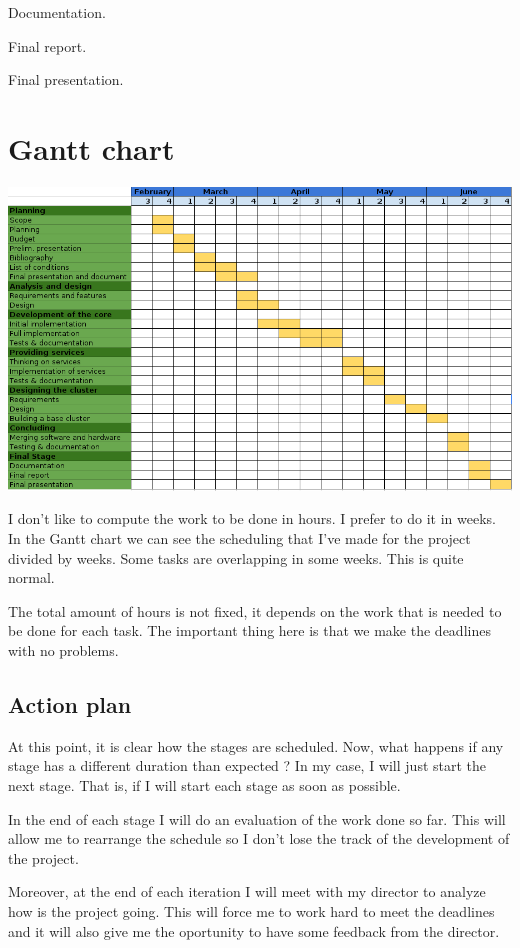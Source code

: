 \mylist
  \item Documentation.
  \item Final report.
  \item Final presentation.
\mylistend

\section*{Gantt chart}

\begin{center}
  \hspace*{-2cm}
  \includegraphics[scale=0.75]{images/gantt.png}
\end{center}

I don't like to compute the work to be done in hours. I prefer to do it in
weeks. In the Gantt chart we can see the scheduling that I've made for the
project divided by weeks. Some tasks are overlapping in some weeks. This is
quite normal.

The total amount of hours is not fixed, it depends on the work that is needed
to be done for each task. The important thing here is that we make the
deadlines with no problems.

\subsection{Action plan}

At this point, it is clear how the stages are scheduled. Now, what happens if
any stage has a different duration than expected ? In my case, I will just
start the next stage. That is, if I will start each stage as soon as possible.

In the end of each stage I will do an evaluation of the work done so far. This
will allow me to rearrange the schedule so I don't lose the track of the
development of the project.

Moreover, at the end of each iteration I will meet with my director to analyze
how is the project going. This will force me to work hard to meet the deadlines
and it will also give me the oportunity to have some feedback from the director.

